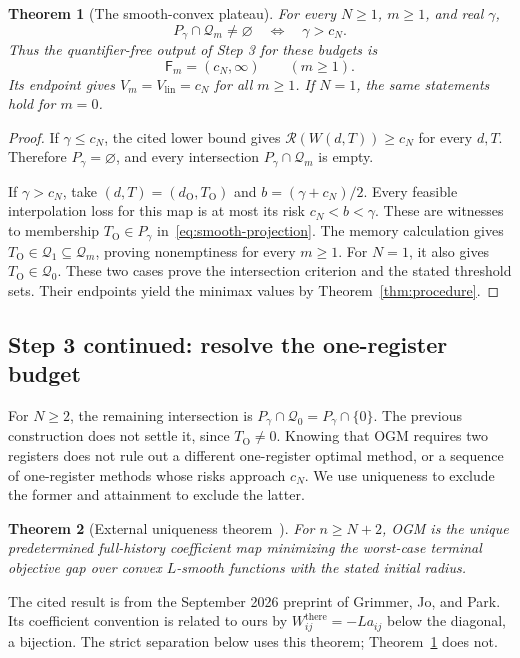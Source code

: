 \documentclass[11pt]{article}
\numberwithin{equation}{section}
\newtheorem{theorem}{Theorem}[section]
\theoremstyle{definition}
\newcommand{\Q}{\mathcal Q}
\newcommand{\risk}{\mathcal R}
\begin{document}
\begin{theorem}[The smooth-convex plateau]\label{thm:smooth-plateau}
For every $N\ge1$, $m\ge1$, and real $\gamma$,
\begin{equation}
 P_\gamma\cap\Q_m\ne\varnothing\quad\Longleftrightarrow\quad\gamma>c_N.
 \label{eq:smooth-intersections}
\end{equation}
Thus the quantifier-free output of Step 3 for these budgets is
\begin{equation}
 \mathsf F_m=(c_N,\infty)\qquad(m\ge1).
 \label{eq:smooth-thresholds}
\end{equation}
Its endpoint gives $V_m=V_{\mathrm{lin}}=c_N$ for all $m\ge1$. If $N=1$, the same statements hold for $m=0$.
\end{theorem}
\begin{proof}
If $\gamma\le c_N$, the cited lower bound gives $\risk(W(d,T))\ge c_N$ for every $d,T$. Therefore $P_\gamma=\varnothing$, and every intersection $P_\gamma\cap\Q_m$ is empty.

If $\gamma>c_N$, take $(d,T)=(d_{\mathrm O},T_{\mathrm O})$ and $b=(\gamma+c_N)/2$. Every feasible interpolation loss for this map is at most its risk $c_N<b<\gamma$. These are witnesses to membership $T_{\mathrm O}\in P_\gamma$ in~\eqref{eq:smooth-projection}. The memory calculation gives $T_{\mathrm O}\in\Q_1\subseteq\Q_m$, proving nonemptiness for every $m\ge1$. For $N=1$, it also gives $T_{\mathrm O}\in\Q_0$. These two cases prove the intersection criterion and the stated threshold sets. Their endpoints yield the minimax values by Theorem~\ref{thm:procedure}.
\end{proof}

\subsection{Step 3 continued: resolve the one-register budget}
For $N\ge2$, the remaining intersection is $P_\gamma\cap\Q_0=P_\gamma\cap\{0\}$. The previous construction does not settle it, since $T_{\mathrm O}\ne0$. Knowing that OGM requires two registers does not rule out a different one-register optimal method, or a sequence of one-register methods whose risks approach $c_N$. We use uniqueness to exclude the former and attainment to exclude the latter.

\begin{theorem}[External uniqueness theorem~{\cite[Theorem 1.1]{GJP}}]\label{thm:uniqueness}
For $n\ge N+2$, OGM is the unique predetermined full-history coefficient map minimizing the worst-case terminal objective gap over convex $L$-smooth functions with the stated initial radius.
\end{theorem}
The cited result is from the September 2026 preprint of Grimmer, Jo, and Park. Its coefficient convention is related to ours by $W^{\mathrm{there}}_{ij}=-La_{ij}$ below the diagonal, a bijection. The strict separation below uses this theorem; Theorem~\ref{thm:smooth-plateau} does not.
\end{document}
